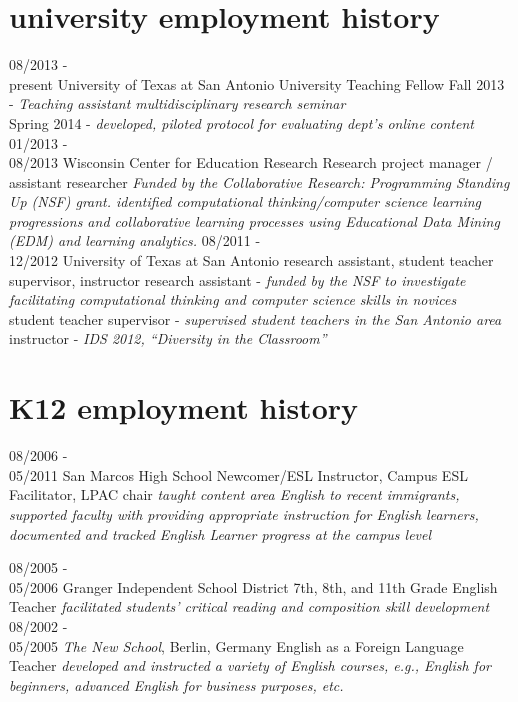 \documentclass[hidelinks]{gnudon}
\begin{document}
\section{university employment history}
\begin{entrylist}
  \entry 
    {08/2013 - \\present}
    {University of Texas at San Antonio}
    {University Teaching Fellow}
    {\small Fall 2013 - {\emph{Teaching assistant multidisciplinary research seminar}} \\ Spring 2014 - {\emph{developed, piloted protocol for evaluating dept's online content}}}
  \entry
    {01/2013 - \\08/2013}
    {Wisconsin Center for Education Research}
    {Research project manager / assistant researcher}
    {\emph{\small Funded by the Collaborative Research: Programming Standing Up (NSF) grant. identified computational thinking/computer science learning progressions and collaborative learning processes using Educational Data Mining (EDM) and learning analytics.}}
  \entry
    {08/2011 - \\12/2012}
    {University of Texas at San Antonio}
    {research assistant, student teacher supervisor, instructor}
    {\small research assistant - {\emph{funded by the NSF to investigate facilitating computational thinking and computer science skills in novices}} \\ student teacher supervisor - {\emph{supervised student teachers in the San Antonio area}} \\ instructor - {\emph{IDS 2012, ``Diversity in the Classroom''}}}
\end{entrylist}

\section{K12 employment history}
\begin{entrylist}
  \entry
    {08/2006 - \\05/2011}
    {San Marcos High School}
    {Newcomer/ESL Instructor, Campus ESL Facilitator, LPAC chair}
    {\small\emph{taught content area English to recent immigrants, supported faculty with providing appropriate instruction for English learners, documented and tracked English Learner progress at the campus level}}
\end{entrylist}
\begin{entrylist}
  \entry
    {08/2005 - \\05/2006}
    {Granger Independent School District }
    { 7th, 8th, and 11th Grade English Teacher}
    {\small\emph{facilitated students' critical reading and composition skill development}}
    \entry
    {08/2002 - \\05/2005}
    {\emph{The New School}, Berlin, Germany}
    {English as a Foreign Language Teacher}
    {\small\emph{developed and instructed a variety of English courses, e.g., English for beginners, advanced English for business purposes, etc.}}
  \end{entrylist}
\end{document}
